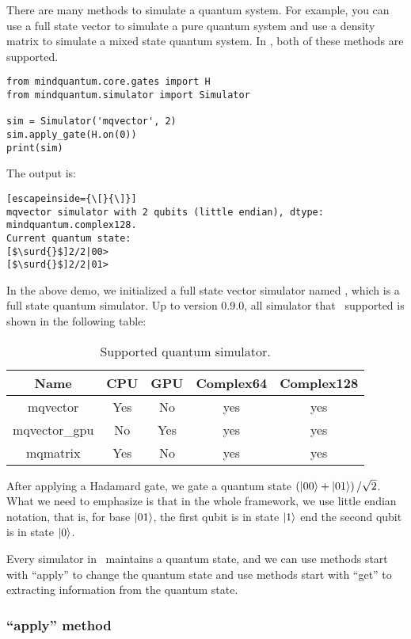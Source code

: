 There are many methods to simulate a quantum system. For example, you can use a full state vector to simulate a pure quantum system and use a density matrix to simulate a mixed state quantum system. In \MindQuantum, both of these methods are supported.

\begin{lstlisting}
from mindquantum.core.gates import H
from mindquantum.simulator import Simulator

sim = Simulator('mqvector', 2)
sim.apply_gate(H.on(0))
print(sim)
\end{lstlisting}
The output is:

\begin{lstlisting}[escapeinside={\[}{\]}]
mqvector simulator with 2 qubits (little endian), dtype: mindquantum.complex128.
Current quantum state:
[$\surd{}$]2/2|00>
[$\surd{}$]2/2|01>
\end{lstlisting}

In the above demo, we initialized a full state vector simulator named , which is a full state quantum simulator. Up to version 0.9.0, all simulator that \MindQuantum\ supported is shown in the following table:
\begin{table}[ht]
    \begin{tabular}{ccccc}
        \toprule
        Name          & CPU & GPU & Complex64 & Complex128 \\
        \midrule
        mqvector      & Yes & No  & yes       & yes        \\
        mqvector\_gpu & No  & Yes & yes       & yes        \\
        mqmatrix      & Yes & No  & yes       & yes        \\
        \bottomrule
    \end{tabular}
    \caption{Supported quantum simulator.}
    \label{tab:simulator_supported}
\end{table}
After applying a Hadamard gate, we gate a quantum state $\left(\ket{00}+\ket{01}\right)/\sqrt{2}$. What we need to emphasize is that in the whole framework, we use little endian notation, that is, for base $\ket{01}$, the first qubit is in state $\ket{1}$ end the second qubit is in state $\ket{0}$.

Every simulator in \MindQuantum\ maintains a quantum state, and we can use methods start with ``apply'' to change the quantum state and use methods start with ``get'' to extracting information from the quantum state.

\subsubsection{``apply'' method}

